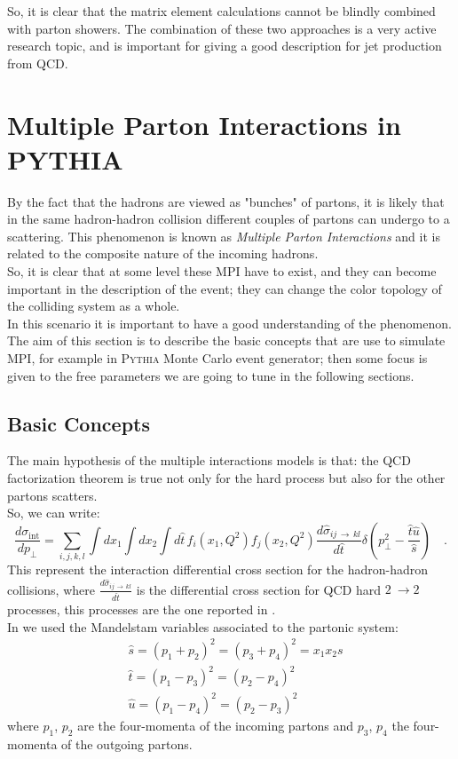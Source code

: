 So, it is clear that the matrix element calculations cannot be blindly combined with parton showers. The combination of these two approaches is a very active research topic, and is important for giving
a good description for jet production from QCD.

\section{Multiple Parton Interactions in PYTHIA}


By the fact that the hadrons are viewed as "bunches" of partons, it is likely that in the same hadron-hadron collision different couples of partons can undergo to a scattering. This phenomenon is known as \textit{Multiple Parton Interactions} and it is related to the composite nature of the incoming hadrons. 
\\
So, it is clear that at some level these MPI have to exist, and they can become important in the description of the event; they can change the color topology of the colliding system as a whole.  
\\
In this scenario it is important to have a good understanding of the phenomenon. The aim of this section is to describe the basic concepts that are use to simulate MPI, for example in \textsc{Pythia} Monte Carlo event generator; then some focus is given to the free parameters we are going to tune in the following sections.

\subsection{Basic Concepts}
\label{sec:BasicConcepts}

The main hypothesis of the multiple interactions models is that: the QCD factorization theorem is true not only for the hard process but also for the other partons scatters.
\\
So, we can write:
\begin{equation}
	\frac{d\sigma_{\text{int}}}{dp_\perp}=\displaystyle\sum_{i,j,k,l}\displaystyle\int dx_1 \displaystyle\int dx_2 \displaystyle\int d\hat{t}\, f_i(x_1,Q^2)f_j(x_2,Q^2)\frac{d\hat{\sigma}_{ij\,\rightarrow\,kl}}{d\hat{t}}\delta\left( p_\perp^2-\frac{\hat{t}\hat{u}}{\hat{s}} \right) \quad .
	\label{eq:sigma_int1}
\end{equation}
This represent the interaction differential cross section for the hadron-hadron collisions, where $\frac{d\hat{\sigma}_{ij\,\rightarrow\,kl}}{d\hat{t}}$ is the differential cross section for QCD hard $2\ \rightarrow 2$ processes, this processes are the one reported in . 
\\
In  we used the Mandelstam variables associated to the partonic system:
\begin{align}
	&\hat{s}=(p_1+p_2)^2=(p_3+p_4)^2=x_1x_2s\\
	&\hat{t}=(p_1-p_3)^2=(p_2-p_4)^2\\
	&\hat{u}=(p_1-p_4)^2=(p_2-p_3)^2
\end{align} 
where $p_1$, $p_2$ are the four-momenta of the incoming partons and $p_3$, $p_4$ the four-momenta of the outgoing partons. 

